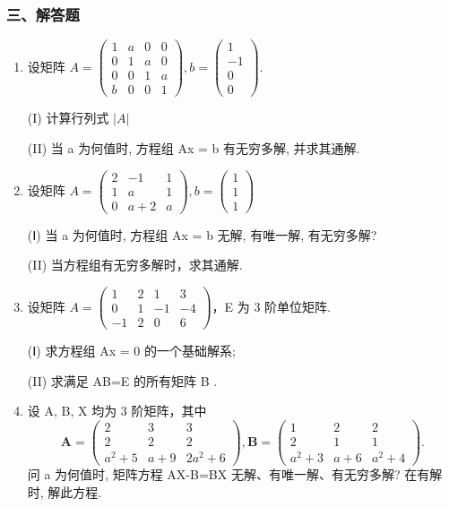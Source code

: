 \documentclass[12pt, a4paper]{ctexart}
\begin{document}
\subsubsection*{三、解答题}

\begin{enumerate}[start=14]
    \item 设矩阵 $ A=\begin{pmatrix}1&a&0&0\\0&1&a&0\\0&0&1&a\\b&0&0&1\end{pmatrix},b=\begin{pmatrix}1\\-1\\0\\0\end{pmatrix} $.
    
    (I) 计算行列式 $ \left|A\right| $
    
    (II) 当 a 为何值时, 方程组 Ax = b 有无穷多解, 并求其通解.

    \item 设矩阵 $ A=\begin{pmatrix}2&-1&1\\1&a&1\\0&a+2&a\end{pmatrix},b=\begin{pmatrix}1\\1\\1\end{pmatrix} $
    
    (Ⅰ) 当 a 为何值时, 方程组 Ax = b 无解, 有唯一解, 有无穷多解?
    
    (II) 当方程组有无穷多解时，求其通解.

    \item 设矩阵 $ A = \begin{pmatrix} 1 & 2 & 1 & 3 \\ 0 & 1 & -1 & -4 \\ -1 & 2 & 0 & 6 \end{pmatrix} $，E 为 3 阶单位矩阵.
    
    (Ⅰ) 求方程组 Ax = 0 的一个基础解系;
    
    (II) 求满足 AB=E 的所有矩阵 B .

    \item 设 A, B, X 均为 3 阶矩阵，其中
    $$ \mathbf{A}=\begin{pmatrix}{{{2}}}&{{{3}}}&{{{3}}} \\{{{2}}}&{{{2}}}&{{{2}}} \\{{{a^{2}+5}}}&{{{a+9}}}&{{{2a^{2}+6}}}\end{pmatrix},\mathbf{B}=\begin{pmatrix}{{{1}}}&{{{2}}}&{{{2}}} \\{{{2}}}&{{{1}}}&{{{1}}} \\{{{a^{2}+3}}}&{{{a+6}}}&{{{a^{2}+4}}}\end{pmatrix}. $$
    问 a 为何值时, 矩阵方程 AX-B=BX 无解、有唯一解、有无穷多解? 在有解时, 解此方程.


\end{enumerate}
\end{document}
